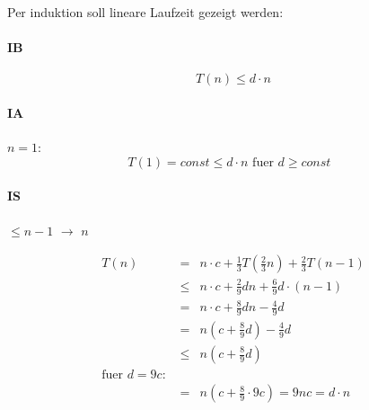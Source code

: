 \begin{enumerate}[(a)]
    Per induktion soll lineare Laufzeit gezeigt werden: 
    
    \paragraph{IB}
    \begin{equation}
    T(n) \leq d \cdot n
    \end{equation}

    \paragraph{IA} $n=1$:
    \begin{equation}
    T(1) = const\leq d \cdot n \text{ fuer $d \geq const$ }
    \end{equation}

    \paragraph{IS} $\leq n-1$ $\to$ $n$

    \begin{eqnarray}
    T(n) &=& n \cdot c + \frac{1}{3} T(\frac{2}{3} n) + \frac{2}{3} T(n-1) \\
         &\leq& n \cdot c + \frac{2}{9} d n + \frac{6}{9} d \cdot (n-1) \\
         &=& n \cdot c + \frac{8}{9} dn - \frac{4}{9} d \\
         &=& n (c + \frac{8}{9} d) - \frac{4}{9} d \\
         &\leq& n (c + \frac{8}{9} d) \\
         \text{fuer $d=9c$: }\\
         &=& n (c + \frac{8}{9} \cdot 9c) = 9 n c = d \cdot n
    \end{eqnarray}
\end{enumerate}

